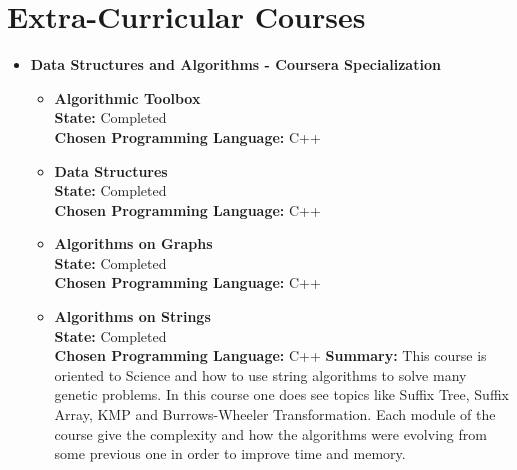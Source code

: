 \documentclass[a4paper,10pt]{article} %
\begin{document}
\section{Extra-Curricular Courses}
\begin{itemize}
\item \textbf{Data Structures and Algorithms - Coursera Specialization}
\begin{itemize}
\item \textbf{Algorithmic Toolbox}\\
\textbf{State:} Completed\\
\textbf{Chosen Programming Language:} C++
\iffalse
\textbf{Summary:} Introduction to different kind of algorithms (Divide and Conquer, Dynamic Programming, Greedy Algorithms, etc). The idea of the course is to provide the students with tools to affront different kind of problems and the best way to solve them.\\
\fi
\item \textbf{Data Structures}\\
\textbf{State:} Completed\\
\textbf{Chosen Programming Language:} C++
\iffalse
\textbf{Summary:} This course gives a definition of many common data structures, including Arrays, Stacks, Trees, Dynamic Arrays, Priority Queues, Disjoint Sets, Binary Search Trees (Search Trees, AVL Trees, Splays Trees). Also, this course gives a good explanation about how those structures work and are implemented in the most common programming languages.\\
\fi
\item \textbf{Algorithms on Graphs}\\
\textbf{State:} Completed\\
\textbf{Chosen Programming Language:} C++
\iffalse
\textbf{Summary:} Explanation about graphs and their properties, starting from how is the best way to represent them taking into account the number of nodes and edges, going through how to traverse a graph, find a shortest path and minimum spanning tree. Time and space complexity are the main factor of the described algorithms.
\fi
\item \textbf{Algorithms on Strings}\\
\textbf{State:} Completed\\
\textbf{Chosen Programming Language:} C++
\iffalse
\textbf{Summary:} This course is oriented to Science and how to use string algorithms to solve many genetic problems. In this course one does see topics like Suffix Tree, Suffix Array, KMP and Burrows-Wheeler Transformation. Each module of the course give the complexity and how the algorithms were evolving from some previous one in order to improve time and memory.

\end{itemize}
\end{itemize}
\end{document}
